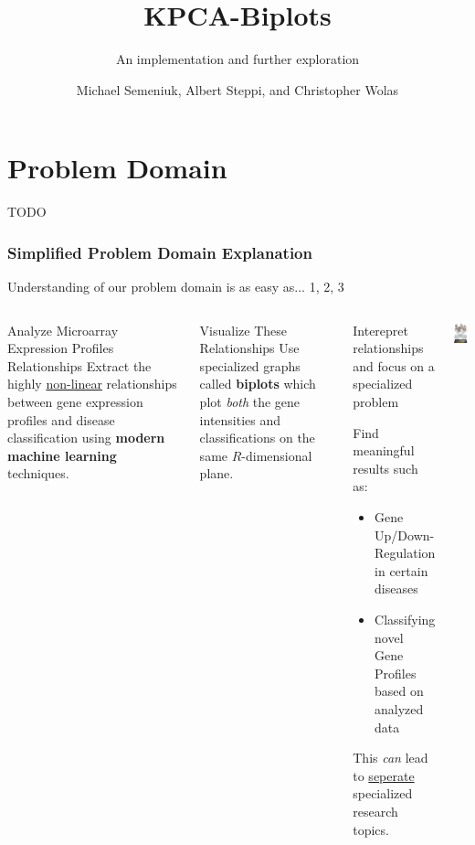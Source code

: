 \documentclass[serif]{beamer}
\title
{
	KPCA-Biplots
}
\subtitle{An implementation and further exploration}
\author
{
	Michael Semeniuk, Albert Steppi, and \linebreak
	Christopher Wolas
}
\date
{
	\begin{block}{}
	\begin{itemize}
		\item
		{
			\underline{Mining Gene Expression Profiles: An Integrated} \linebreak
			\underline{Implementation of Kernel Principal Component} \linebreak
			\underline{Analysis and Singular Value Decomposition}
			\begin{itemize}
					\item  Reverter et al,Genomics Proteomics Bioinformatics (2010)
			\end{itemize}
		}
	\end{itemize}	
	\end{block}
	
}
\begin{document}
	
	\section{Problem Domain}
	
	\begin{frame}
		\titlepage
		
		\note
		{
			TODO
		}		
	\end{frame}

	\begin{frame}[t]
	\frametitle{Simplified Problem Domain Explanation}
		Understanding of our problem domain is as easy as... \linebreak
		\uncover<1-> {1, }
		\uncover<2-> {2, }
		\uncover<3>  {3}
		\begin{columns}[t]
		
			\column{2in}
			{
				\only<1>
				{
					\begin{block}
					{ 
						Analyze Microarray Expression Profiles Relationships
					}
					{
						Extract the highly \underline{non-linear} relationships
						between gene expression profiles and disease 
						classification using \textbf{modern machine learning} techniques.	
					}
					\end{block}
				}
				\only<2>
				{
					\begin{block}
						{ 
							Visualize These Relationships
						}
						{
							Use specialized graphs called \textbf{biplots}
							which plot \emph{both} the gene intensities and classifications on the same $R$-dimensional plane.
						}
					\end{block}
				}
				\only<3>
				{
					\begin{block}
					{
						Interepret relationships and focus on
						a specialized problem						
					}
					{
						\footnotesize 
						Find meaningful results such as:
						\begin{itemize}
							\item Gene Up/Down-\linebreak 
							Regulation in certain diseases
							\item Classifying novel Gene Profiles based on
							analyzed data
						\end{itemize}
						This \emph{can} lead to \underline{seperate} specialized
						research topics.
					}
					\end{block}
				}
			}
			\column{1in}
			{
				\only<1>
				{
					\begin{center}
						\includegraphics[width=1in]{images/microarray}	

\end{center}}}
\end{columns}
\end{frame}
\end{document}
